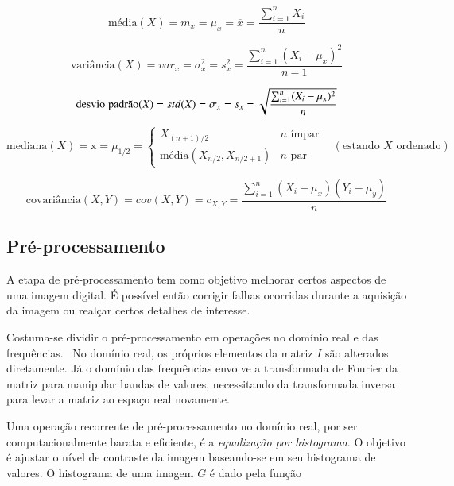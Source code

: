 \begin{equation}
\text{média}(X) = m_x=\mu_x=\overline{x}=\frac{\sum_{i=1}^{n}X_i}{n}
\end{equation}

\begin{equation}
\text{variância}(X)=var_x=\sigma^2_x=s^2_x=\frac{\sum_{i=1}^{n}(X_i-\mu_x)^2}{n-1}
\end{equation}

\begin{equation}
\text{desvio\;padrão}(X)=std(X)=\sigma_x=s_x=\sqrt{\frac{\sum_{i=1}^{n}(X_i-\mu_x)^2}{n}}
\end{equation}

\begin{equation}
\text{mediana}(X) = \text{\~{x}} =\mu_{1/2}= \begin{cases}
                               X_{(n+1)/2} & n \,\, \text{ímpar} \\
                               \text{média}(X_{n/2}, X_{n/2+1}) & n \,\, \text{par}
                               \end{cases} \,\,\,\,\, (\text{estando $X$ ordenado})
\end{equation}


\begin{equation}
\text{covariância}(X,Y)=cov(X,Y)=c_{X,Y}=\frac{\sum_{i=1}^{n}(X_i-\mu_x)(Y_i-\mu_y) }{n}
\end{equation}

\subsection{Pré-processamento}
\label{sec:preproc}

A etapa de pré-processamento tem como objetivo melhorar certos
aspectos de uma imagem digital. É possível então corrigir falhas
ocorridas durante a aquisição da imagem ou realçar certos detalhes de
interesse.

Costuma-se dividir o pré-processamento em operações no domínio real e
das frequências.~\cite{gonzalez} No domínio real, os próprios
elementos da matriz $I$ são alterados diretamente. Já o domínio das
frequências envolve a transformada de Fourier da matriz para manipular
bandas de valores, necessitando da transformada inversa para levar a
matriz ao espaço real novamente.

Uma operação recorrente de pré-processamento no domínio real, por ser
computacionalmente barata e eficiente, é a \emph{equalização por
  histograma}. O objetivo é ajustar o nível de contraste da imagem
baseando-se em seu histograma de valores. O histograma de uma imagem
$G$ é dado pela função

